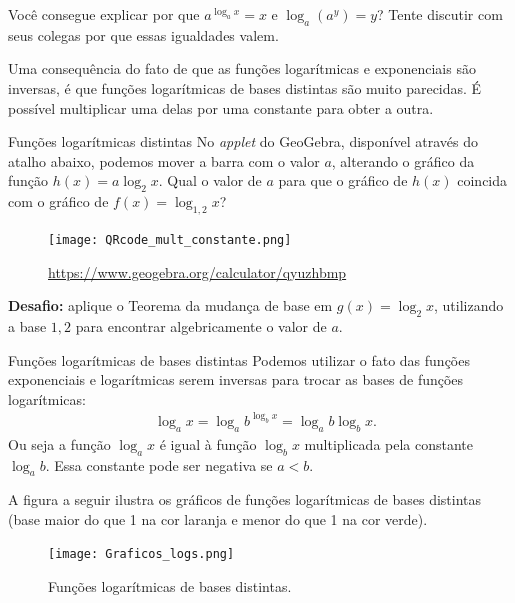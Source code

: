 \begin{reflection}
Você consegue explicar por que $a^{\log_a x}=x$ e $\log_a (a^y) = y$? Tente discutir com seus colegas por que essas igualdades valem.
\end{reflection}


Uma consequência do fato de que as funções logarítmicas e exponenciais são inversas, é que funções logarítmicas de bases distintas são muito parecidas. É possível multiplicar uma delas por uma constante para obter a outra.


\begin{task}{Funções logarítmicas distintas}
No \textit{applet} do GeoGebra, disponível através do atalho abaixo, podemos mover a barra com o valor $a$, alterando o gráfico da função $h(x) = a \log_2 x$. Qual o valor de $a$ para que o gráfico de $h(x)$ coincida com o gráfico de $f(x) = \log_{1{,}2} x$?


\begin{figure}[H]
\centering

\texttt{[image: QRcode\_mult\_constante.png]}

\url{https://www.geogebra.org/calculator/qyuzhbmp}
\end{figure}

\textbf{Desafio:} aplique o Teorema da mudança de base em $g(x)= \log_2 x$, utilizando a base $1{,}2$ para encontrar algebricamente o valor de $a$.
\end{task}


\begin{observation}{Funções logarítmicas de bases distintas}
Podemos utilizar o fato das funções exponenciais e logarítmicas serem inversas para trocar as bases de funções logarítmicas:
\begin{align*}
&\log_a x = \log_a b^{\log_b x} =\log_a b\log_b x.
\end{align*}
Ou seja a função $\log_a x$ é igual à função $\log_b x$ multiplicada pela constante $\log_a b$. Essa constante pode ser negativa se $a<b$.
\end{observation}

A figura a seguir ilustra os gráficos de funções logarítmicas de bases distintas (base maior do que 1 na cor laranja e menor do que 1 na cor verde).

\begin{figure}[!htb]
\centering
\texttt{[image: Graficos\_logs.png]}
\caption{Funções logarítmicas de bases distintas.}
\end{figure}


